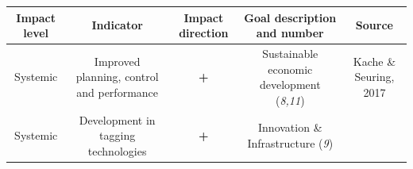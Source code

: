 \documentclass[
]{book}
\begin{document}
\begin{longtable}[]{@{}ccccc@{}}
\toprule
\begin{minipage}[b]{0.17\columnwidth}\centering
Impact level\strut
\end{minipage} & \begin{minipage}[b]{0.16\columnwidth}\centering
Indicator\strut
\end{minipage} & \begin{minipage}[b]{0.17\columnwidth}\centering
Impact direction\strut
\end{minipage} & \begin{minipage}[b]{0.17\columnwidth}\centering
Goal description and number\strut
\end{minipage} & \begin{minipage}[b]{0.17\columnwidth}\centering
Source\strut
\end{minipage}\tabularnewline
\midrule
\endhead
\begin{minipage}[t]{0.17\columnwidth}\centering
Systemic\strut
\end{minipage} & \begin{minipage}[t]{0.16\columnwidth}\centering
Improved planning, control and performance\strut
\end{minipage} & \begin{minipage}[t]{0.17\columnwidth}\centering
\textbf{+}\strut
\end{minipage} & \begin{minipage}[t]{0.17\columnwidth}\centering
Sustainable economic development (\emph{8,11})\strut
\end{minipage} & \begin{minipage}[t]{0.17\columnwidth}\centering
Kache \& Seuring, 2017\strut
\end{minipage}\tabularnewline
\begin{minipage}[t]{0.17\columnwidth}\centering
Systemic\strut
\end{minipage} & \begin{minipage}[t]{0.16\columnwidth}\centering
Development in tagging technologies\strut
\end{minipage} & \begin{minipage}[t]{0.17\columnwidth}\centering
\textbf{+}\strut
\end{minipage} & \begin{minipage}[t]{0.17\columnwidth}\centering
Innovation \& Infrastructure (\emph{9})\strut
\end{minipage} & \begin{minipage}[t]{0.17\columnwidth}\centering

\end{minipage}
\end{longtable}
\end{document}
